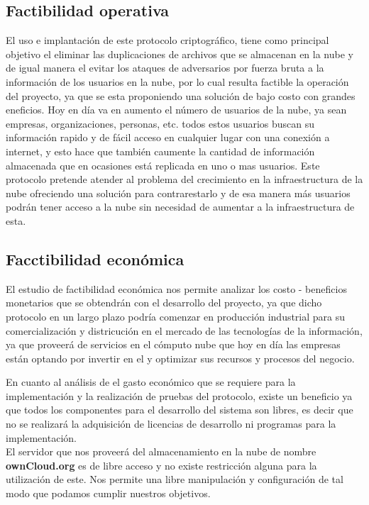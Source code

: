 \subsection{Factibilidad operativa}
El uso e implantación de este protocolo criptográfico, tiene como principal objetivo el eliminar las duplicaciones de archivos que se almacenan en la nube y de igual manera el evitar los ataques de adversarios por fuerza bruta a la información de los usuarios en la nube, por lo cual resulta factible la operación del proyecto, ya que se esta proponiendo una solución de bajo costo con grandes eneficios.
Hoy en día va en aumento el número de usuarios de la nube, ya sean empresas, organizaciones, personas, etc. todos estos usuarios buscan su información rapido y de fácil acceso en cualquier lugar con una conexión a internet, y esto hace que también caumente la cantidad de información almacenada que en ocasiones está replicada en uno o mas usuarios.
Este protocolo pretende atender al problema del crecimiento en la infraestructura de la nube ofreciendo una solución para contrarestarlo y de esa manera más usuarios podrán tener acceso a la nube sin necesidad de aumentar a la infraestructura de esta.

\subsection{Facctibilidad económica}
El estudio de factibilidad económica nos permite analizar los costo - beneficios monetarios que se obtendrán con el desarrollo del proyecto, ya que dicho protocolo en un largo plazo podría comenzar en producción industrial para su comercialización y districución en el mercado de las tecnologías de la información, ya que proveerá de servicios en el cómputo nube que hoy en día las empresas están optando por invertir en el y optimizar sus recursos y procesos del negocio. 

En cuanto al análisis de el gasto económico que se requiere para la implementación y la realización de pruebas del protocolo, existe un beneficio ya que todos los componentes para el desarrollo del sistema son libres, es decir que no se realizará la adquisición de licencias de desarrollo ni programas para la implementación. 
\\ El servidor que nos proveerá del almacenamiento en la nube de nombre \textbf{ownCloud.org} es de libre acceso y no existe restricción alguna para la utilización de este. Nos permite una libre manipulación y configuración de tal modo que podamos cumplir nuestros objetivos.


